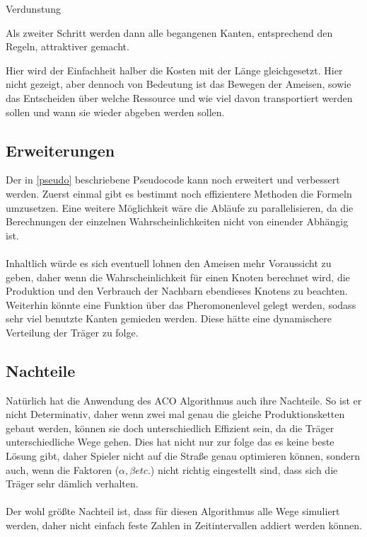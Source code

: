 \documentclass[12pt]{article}
\begin{document}
\begin{algorithm}[H]
\caption{Verdunstung}
\end{algorithm}Als zweiter Schritt werden dann alle begangenen Kanten, entsprechend den Regeln, attraktiver gemacht.
\begin{algorithm}
\DontPrintSemicolon
{}
Hier wird der Einfachheit halber die Kosten mit der Länge gleichgesetzt.
Hier nicht gezeigt, aber dennoch von Bedeutung ist das Bewegen der Ameisen, sowie das Entscheiden über welche Ressource und wie viel davon transportiert werden sollen und wann sie wieder abgeben werden sollen.
\end{algorithm}
\subsection{Erweiterungen}
Der in \ref{pseudo} beschriebene Pseudocode kann noch erweitert und verbessert werden. Zuerst einmal gibt es bestimmt noch effizientere Methoden die Formeln umzusetzen.
Eine weitere Möglichkeit wäre die Abläufe zu parallelisieren, da die Berechnungen der einzelnen Wahrscheinlichkeiten nicht von einender Abhängig ist.\\\\
Inhaltlich würde es sich eventuell lohnen den Ameisen mehr Voraussicht zu geben, daher wenn die Wahrscheinlichkeit für einen Knoten berechnet wird, die Produktion und den Verbrauch der Nachbarn ebendieses Knotens zu beachten. 
Weiterhin könnte eine Funktion über das Pheromonenlevel gelegt werden, sodass sehr viel benutzte Kanten gemieden werden. Diese hätte eine dynamischere Verteilung der Träger zu folge.
\subsection{Nachteile}\label{Nachteile}
Natürlich hat die Anwendung des ACO Algorithmus auch ihre Nachteile. So ist er nicht Determinativ, daher wenn zwei mal genau die gleiche Produktionsketten gebaut werden, können sie doch unterschiedlich Effizient sein, da die Träger unterschiedliche Wege gehen.
Dies hat nicht nur zur folge das es keine beste Lösung gibt, daher Spieler nicht auf die Straße genau optimieren können, sondern auch, wenn die Faktoren ($\alpha,\beta etc.$) nicht richtig eingestellt sind, dass sich die Träger sehr dämlich verhalten.\\\\
Der wohl größte Nachteil ist, dass für diesen Algorithmus alle Wege simuliert werden, daher nicht einfach feste Zahlen in Zeitintervallen addiert werden können.
\end{document}
